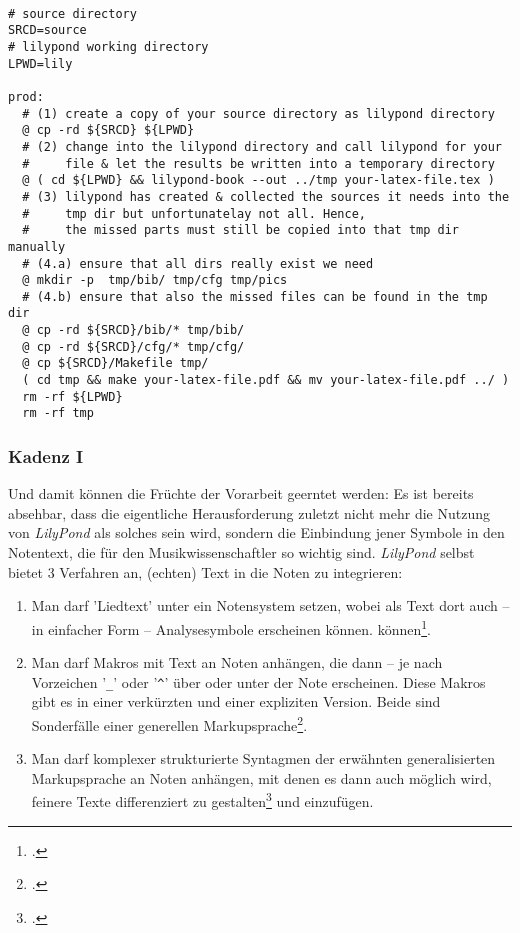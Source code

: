 \begin{verbatim}

# source directory
SRCD=source
# lilypond working directory
LPWD=lily

prod: 
  # (1) create a copy of your source directory as lilypond directory 
  @ cp -rd ${SRCD} ${LPWD}
  # (2) change into the lilypond directory and call lilypond for your
  #     file & let the results be written into a temporary directory
  @ ( cd ${LPWD} && lilypond-book --out ../tmp your-latex-file.tex )
  # (3) lilypond has created & collected the sources it needs into the 
  #     tmp dir but unfortunatelay not all. Hence, 
  #     the missed parts must still be copied into that tmp dir manually
  # (4.a) ensure that all dirs really exist we need
  @ mkdir -p  tmp/bib/ tmp/cfg tmp/pics
  # (4.b) ensure that also the missed files can be found in the tmp dir
  @ cp -rd ${SRCD}/bib/* tmp/bib/
  @ cp -rd ${SRCD}/cfg/* tmp/cfg/
  @ cp ${SRCD}/Makefile tmp/
  ( cd tmp && make your-latex-file.pdf && mv your-latex-file.pdf ../ )
  rm -rf ${LPWD}
  rm -rf tmp

\end{verbatim}


\subsubsection{Kadenz I}
\label{LilyPondKadenzI}
Und damit können die Früchte der Vorarbeit geerntet werden: Es ist bereits
absehbar, dass die eigentliche Herausforderung zuletzt nicht mehr die Nutzung
von \textit{LilyPond} als solches sein wird, sondern die Einbindung jener
Symbole in den Notentext, die für den Musikwissenschaftler so wichtig sind.
\textit{LilyPond} selbst bietet 3 Verfahren an, (echten) Text in die Noten zu
integrieren:

\begin{enumerate}
  \item Man darf 'Liedtext' unter ein Notensystem setzen, wobei als Text dort
  auch -- in einfacher Form  -- Analysesymbole erscheinen können.
  können\footcite[vgl.][31ff]{LilyPond2018b}.
  \item Man darf Makros mit Text an Noten anhängen, die dann -- je nach
  Vorzeichen '\texttt{\_}' oder '\texttt{\^}' über oder unter der Note
  erscheinen. Diese Makros gibt es in einer verkürzten und einer expliziten
  Version. Beide sind Sonderfälle einer generellen
  Markupsprache\footcite[vgl.][211ff]{LilyPond2018c}.
  \item Man darf komplexer strukturierte Syntagmen der erwähnten generalisierten
  Markupsprache an Noten anhängen, mit denen es dann auch möglich wird, feinere
  Texte differenziert zu gestalten\footcite[vgl.][218ff]{LilyPond2018c} und
  einzufügen.
\end{enumerate}

